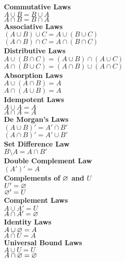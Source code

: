 \documentclass{report}
\begin{document}
\begin{multicols}{2}
	\textbf{Commutative Laws} \\
	$A\cup B = B\cup A$ \\
	$A\cap B = B\cap A$ \\

	\textbf{Associative Laws} \\
	$(A\cup B)\cup C = A\cup(B\cup C)$ \\
	$(A\cap B)\cap C = A\cap(B\cap C)$ \\ 

	\textbf{Distributive Laws} \\
	$A\cup(B\cap C) = (A\cup B)\cap(A\cup C)$ \\
	$A\cap(B\cup C) = (A\cap B)\cup(A\cap C)$ \\

	\textbf{Absorption Laws} \\
	$A\cup(A\cap B) = A$ \\
	$A\cap (A\cup B) = A$ \\

	\textbf{Idempotent Laws} \\
	$A\cup A = A$ \\
	$A\cap A = A$ \\

	\textbf{De Morgan's Laws} \\
	$(A\cup B)' = A' \cap B'$ \\
	$(A\cap B)' = A' \cup B'$ \\

	\textbf{Set Difference Law} \\
	$B\setminus A = A\cap B'$ \\

	\textbf{Double Complement Law} \\
	$(A')' = A$ \\

	\textbf{Complements of $\varnothing$ and $U$} \\
	$U' = \varnothing$ \\
	$\varnothing' = U$ \\

	\textbf{Complement Laws} \\
	$A\cup A' = U$ \\
	$A\cap A' = \varnothing$ \\

	\textbf{Identity Laws} \\
	$A\cup \varnothing = A$ \\
	$A\cap U = A$ \\

	\textbf{Universal Bound Laws} \\
	$A\cup U = U$ \\
	$A\cap \varnothing = \varnothing$ \\
\end{multicols}
\end{document}
